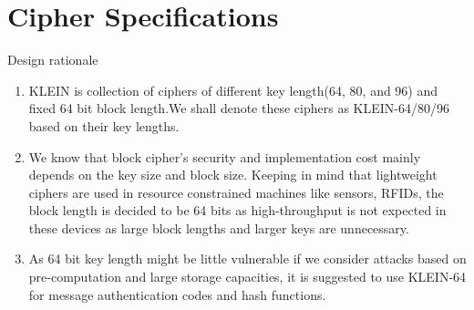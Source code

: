 \section{Cipher Specifications}

\begin{frame}{Design rationale}
\begin{enumerate}
    \item KLEIN is collection of ciphers of different key length(64, 80, and 96) and fixed 64 bit block length.We shall denote these ciphers as KLEIN-64/80/96 based on their key lengths.
    \item We know that block cipher's security and implementation cost mainly depends on the key size and block size. Keeping in mind that lightweight ciphers are used in resource constrained machines like sensors, RFIDs, the block length is decided to be 64 bits as high-throughput is not expected in these devices as large block lengths and larger keys are unnecessary.
    \item As 64 bit key length might be little vulnerable if we consider attacks based on pre-computation and large storage capacities, it is suggested to use KLEIN-64 for message authentication codes and hash functions.
\end{enumerate}
\end{frame}

